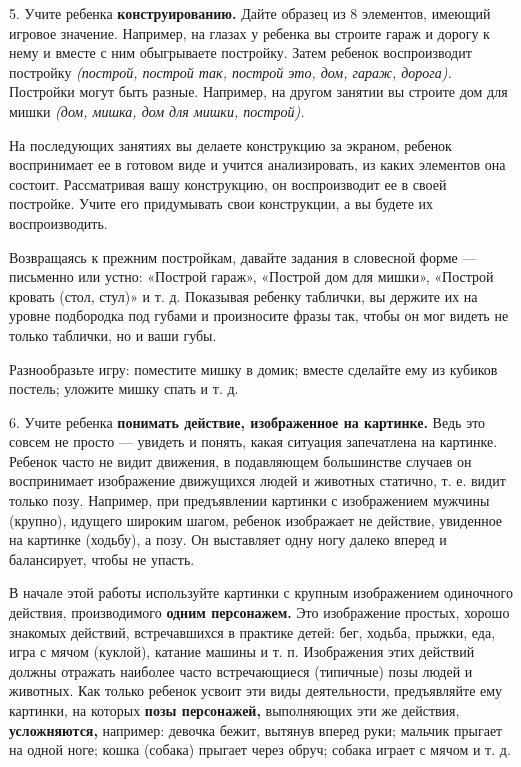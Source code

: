 \documentclass[a5paper]{book}
\renewcommand{\emph}[1]{\textit{#1}}
\begin{document}
5. Учите ребенка \textbf{конструированию.} Дайте образец из 8 элементов,
имеющий игровое значение. Например, на глазах у ребенка вы строите гараж
и дорогу к нему и вместе с ним обыгрываете постройку. Затем ребенок
воспроизводит постройку \emph{(построй, построй так, построй это, дом,
гараж, дорога).} Постройки могут быть разные. Например, на другом
занятии вы строите дом для мишки \emph{(дом, мишка, дом для мишки,
построй).}

На последующих занятиях вы делаете конструкцию за экраном, ребенок
воспринимает ее в готовом виде и учится анализировать, из каких
элементов она состоит. Рассматривая вашу конструкцию, он воспроизводит
ее в своей постройке. Учите его придумывать свои конструкции, а вы
будете их воспроизводить.

Возвращаясь к прежним постройкам, давайте задания в словесной форме ---
письменно или устно: «Построй гараж», «Построй дом для мишки», «Построй
кровать (стол, стул)» и т. д. Показывая ребенку таблички, вы держите их
на уровне подбородка под губами и произносите фразы так, чтобы он мог
видеть не только таблички, но и ваши губы.

Разнообразьте игру: поместите мишку в домик; вместе сделайте ему из
кубиков постель; уложите мишку спать и т. д.

6. Учите ребенка \textbf{понимать действие, изображенное на картинке.}
Ведь это совсем не просто --- увидеть и понять, какая ситуация
запечатлена на картинке. Ребенок часто не видит движения, в подавляющем
большинстве случаев он воспринимает изображение движущихся людей и
животных статично, т. е. видит только позу. Например, при предъявлении
картинки с изображением мужчины (крупно), идущего широким шагом, ребенок
изображает не действие, увиденное на картинке (ходьбу), а позу. Он
выставляет одну ногу далеко вперед и балансирует, чтобы не упасть.

В начале этой работы используйте картинки с крупным изображением
одиночного действия, производимого \textbf{одним персонажем.} Это
изображение простых, хорошо знакомых действий, встречавшихся в практике
детей: бег, ходьба, прыжки, еда, игра с мячом (куклой), катание машины и
т. п. Изображения этих действий должны отражать наиболее часто
встречающиеся (типичные) позы людей и животных. Как только ребенок
усвоит эти виды деятельности, предъявляйте ему картинки, на которых
\textbf{позы персонажей,} выполняющих эти же действия,
\textbf{усложняются,} например: девочка бежит, вытянув вперед руки;
мальчик прыгает на одной ноге; кошка (собака) прыгает через обруч;
собака играет с мячом и т. д.
\end{document}
